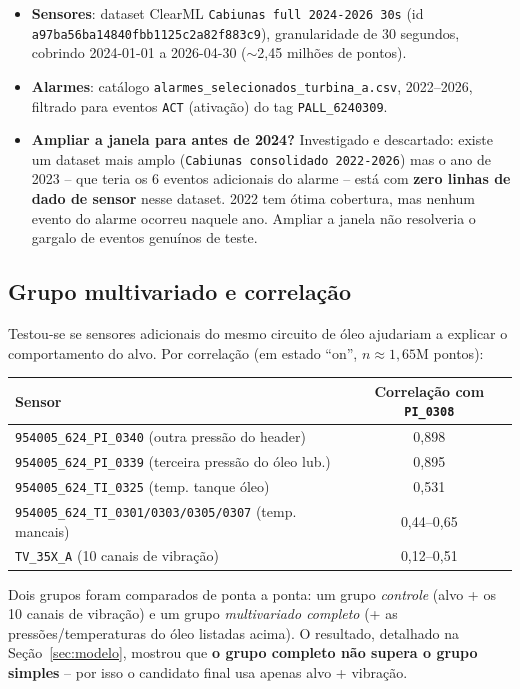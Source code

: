 \documentclass[11pt,a4paper]{article}
\begin{document}
\begin{itemize}[leftmargin=1.4em]
  \item \textbf{Sensores}: dataset ClearML \texttt{Cabiunas full 2024-2026 30s}
  (id \texttt{a97ba56ba14840fbb1125c2a82f883c9}), granularidade de 30 segundos,
  cobrindo 2024-01-01 a 2026-04-30 ($\sim$2,45 milhões de pontos).
  \item \textbf{Alarmes}: catálogo \texttt{alarmes\_selecionados\_turbina\_a.csv},
  2022--2026, filtrado para eventos \texttt{ACT} (ativação) do tag
  \texttt{PALL\_6240309}.
  \item \textbf{Ampliar a janela para antes de 2024?} Investigado e
  descartado: existe um dataset mais amplo (\texttt{Cabiunas consolidado
  2022-2026}) mas o ano de 2023 -- que teria os 6 eventos adicionais do
  alarme -- está com \textbf{zero linhas de dado de sensor} nesse dataset.
  2022 tem ótima cobertura, mas nenhum evento do alarme ocorreu naquele
  ano. Ampliar a janela não resolveria o gargalo de eventos genuínos de
  teste.
\end{itemize}

\subsection{Grupo multivariado e correlação}

Testou-se se sensores adicionais do mesmo circuito de óleo ajudariam a
explicar o comportamento do alvo. Por correlação (em estado ``on'', $n
\approx 1{,}65$M pontos):

\begin{center}
\begin{tabular}{lc}
\toprule
Sensor & Correlação com \texttt{PI\_0308} \\
\midrule
\texttt{954005\_624\_PI\_0340} (outra pressão do header) & 0,898 \\
\texttt{954005\_624\_PI\_0339} (terceira pressão do óleo lub.) & 0,895 \\
\texttt{954005\_624\_TI\_0325} (temp. tanque óleo) & 0,531 \\
\texttt{954005\_624\_TI\_0301/0303/0305/0307} (temp. mancais) & 0,44--0,65 \\
\texttt{TV\_35X\_A} (10 canais de vibração) & 0,12--0,51 \\
\bottomrule
\end{tabular}
\end{center}

Dois grupos foram comparados de ponta a ponta: um grupo \emph{controle}
(alvo + os 10 canais de vibração) e um grupo \emph{multivariado completo}
(+ as pressões/temperaturas do óleo listadas acima). O resultado, detalhado
na Seção~\ref{sec:modelo}, mostrou que \textbf{o grupo completo não supera
o grupo simples} -- por isso o candidato final usa apenas alvo + vibração.
\end{document}
